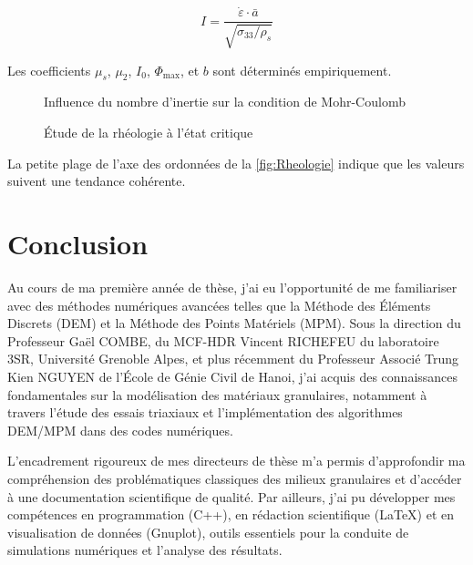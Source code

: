 \documentclass[a4paper,12pt]{report}
\begin{document}
\begin{equation}
I =  \frac{\dot{\varepsilon} \cdot \bar{a}}{\sqrt{\sigma_{33}/\rho_s}}
\label{IMacro}
\end{equation}

Les coefficients $\mu_s$, $\mu_2$, $I_0$, $\Phi_{\max}$, et $b$ sont déterminés empiriquement.

\begin{figure}[h!]
    \centering
  \caption{Influence du nombre d’inertie sur la condition de Mohr-Coulomb}
  \label{fig:IResiduel}
\end{figure}

\begin{figure}[h!]
    \centering
    \subfloat[$\mu(I)$]{\scalebox{0.49}{}\label{fig:etudeSurI2}}
    \subfloat[$\Phi(I)$]{\scalebox{0.49}{}\label{fig:cercleResiduel2}}
  \caption{Étude de la rhéologie à l’état critique}
  \label{fig:Rheologie}
\end{figure}

La petite plage de l’axe des ordonnées de la \autoref{fig:Rheologie} indique que les valeurs suivent une tendance cohérente.

\chapter{Conclusion}

Au cours de ma première année de thèse, j’ai eu l’opportunité de me familiariser avec des méthodes numériques avancées telles que la Méthode des Éléments Discrets (DEM) et la Méthode des Points Matériels (MPM).  
Sous la direction du Professeur Gaël COMBE, du MCF-HDR Vincent RICHEFEU du laboratoire 3SR, Université Grenoble Alpes, et plus récemment du Professeur Associé Trung Kien NGUYEN de l’École de Génie Civil de Hanoi, j’ai acquis des connaissances fondamentales sur la modélisation des matériaux granulaires, notamment à travers l’étude des essais triaxiaux et l’implémentation des algorithmes DEM/MPM dans des codes numériques.

L’encadrement rigoureux de mes directeurs de thèse m’a permis d’approfondir ma compréhension des problématiques classiques des milieux granulaires et d’accéder à une documentation scientifique de qualité. Par ailleurs, j’ai pu développer mes compétences en programmation (C++), en rédaction scientifique (LaTeX) et en visualisation de données (Gnuplot), outils essentiels pour la conduite de simulations numériques et l’analyse des résultats.
\end{document}
